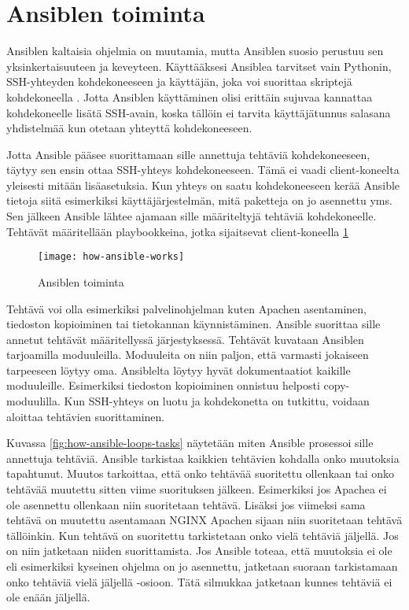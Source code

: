 \section{Ansiblen toiminta}

Ansiblen kaltaisia ohjelmia on muutamia, mutta Ansiblen suosio perustuu sen yksinkertaisuuteen ja keveyteen. Käyttääksesi Ansiblea tarvitset vain Pythonin, SSH-yhteyden kohdekoneeseen ja käyttäjän, joka voi suorittaa skriptejä kohdekoneella \cite{link:what-is-ansible}. Jotta Ansiblen käyttäminen olisi erittäin sujuvaa kannattaa kohdekoneelle lisätä SSH-avain, koska tällöin ei tarvita käyttäjätunnus salasana yhdistelmää kun otetaan yhteyttä kohdekoneeseen.

Jotta Ansible pääsee suorittamaan sille annettuja tehtäviä kohdekoneeseen, täytyy sen ensin ottaa SSH-yhteys kohdekoneeseen. Tämä ei vaadi client-koneelta yleisesti mitään lisäasetuksia. Kun yhteys on saatu kohdekoneeseen kerää Ansible tietoja siitä esimerkiksi käyttäjärjestelmän, mitä paketteja on jo asennettu yms. Sen jälkeen Ansible lähtee ajamaan sille määriteltyjä tehtäviä kohdekoneelle. Tehtävät määritellään playbookkeina, jotka sijaitsevat client-koneella \ref{fig:how-ansible-works}

\begin{figure}[h]
  \texttt{[image: how-ansible-works]}
  \caption{Ansiblen toiminta}
  \label{fig:how-ansible-works}
\end{figure}

Tehtävä voi olla esimerkiksi palvelinohjelman kuten Apachen asentaminen, tiedoston kopioiminen tai tietokannan käynnistäminen. Ansible suorittaa sille annetut tehtävät määritellyssä järjestyksessä. Tehtävät kuvataan Ansiblen tarjoamilla moduuleilla. Moduuleita on niin paljon, että varmasti jokaiseen tarpeeseen löytyy oma. Ansiblelta löytyy hyvät dokumentaatiot kaikille moduuleille. Esimerkiksi tiedoston kopioiminen onnistuu helposti copy-moduulilla. Kun SSH-yhteys on luotu ja kohdekonetta on tutkittu, voidaan aloittaa tehtävien suorittaminen.

Kuvassa \ref{fig:how-ansible-loops-tasks} näytetään miten Ansible prosessoi sille annettuja tehtäviä. Ansible tarkistaa kaikkien tehtävien kohdalla onko muutoksia tapahtunut. Muutos tarkoittaa, että onko tehtävää suoritettu ollenkaan tai onko tehtävää muutettu sitten viime suorituksen jälkeen. Esimerkiksi jos Apachea ei ole asennettu ollenkaan niin suoritetaan tehtävä. Lisäksi jos viimeksi sama tehtävä on muutettu asentamaan NGINX Apachen sijaan niin suoritetaan tehtävä tällöinkin. Kun tehtävä on suoritettu tarkistetaan onko vielä tehtäviä jäljellä. Jos on niin jatketaan niiden suorittamista. Jos Ansible toteaa, että muutoksia ei ole eli esimerkiksi kyseinen ohjelma on jo asennettu, jatketaan suoraan tarkistamaan onko tehtäviä vielä jäljellä -osioon. Tätä silmukkaa jatketaan kunnes tehtäviä ei ole enään jäljellä.

